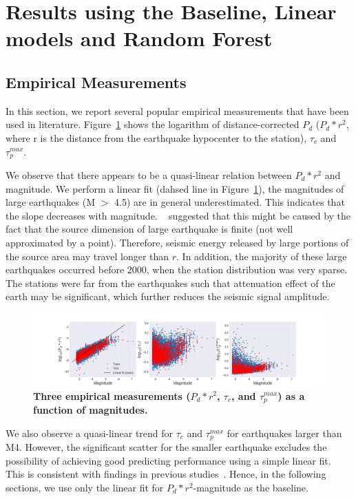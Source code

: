 \documentclass{article} %
\begin{document}
\section{Results using the Baseline, Linear models and Random Forest}

\subsection{Empirical Measurements}
In this section, we report several popular empirical measurements that have been used in literature. Figure~\ref{empirical_measurements} shows the logarithm of distance-corrected $P_d$ ($P_d * r^2$, where r is the distance from the earthquake hypocenter to the station), $\tau_c$ and $\tau_p^{max}$. 

We observe that there appears to be a quasi-linear relation between $P_d * r^2$ and magnitude. We perform a linear fit (dahsed line in Figure~\ref{empirical_measurements}), the magnitudes of large earthquakes (M $>$ 4.5) are in general underestimated. This indicates that the slope decreases with magnitude. ~\cite{Wurman2007} suggested that this might be caused by the fact that the source dimension of large earthquake is finite (not well approximated by a point). Therefore, seismic energy released by large portions of the source area may travel longer than $r$. In addition, the majority of these large earthquakes occurred before 2000, when the station distribution was very sparse. The stations were far from the earthquakes such that attenuation effect of the earth may be significant, which further reduces the seismic signal amplitude.     

\begin{figure}[ht!]
	\centering
	\includegraphics*[scale=0.33, viewport= 40mm 0mm 500mm 120mm, angle=0]{./figure/empirical_measurements.png}
	\caption{{\bf Three empirical measurements ($P_d * r^2$, $\tau_c$, and $\tau_p^{max}$) as a function of magnitudes.}}\label{empirical_measurements} 
\end{figure}

We also observe a quasi-linear trend for $\tau_c$ and $\tau_p^{max}$ for earthquakes larger than M4. However, the significant scatter for the smaller earthquake excludes the possibility of achieving good predicting performance using a simple linear fit. This is consistent with findings in previous studies~\cite{Wurman2007}. Hence, in the following sections, we use only the linear fit for $P_d * r^2$-magnitude as the baseline.  
\end{document}

